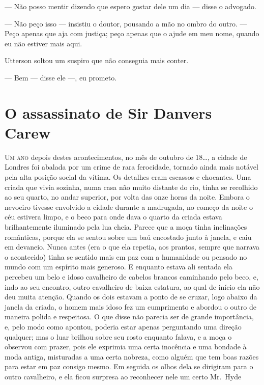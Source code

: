 --- Não posso mentir dizendo que espero gostar dele um dia --- disse o
advogado.

--- Não peço isso --- insistiu o doutor, pousando a mão no ombro do outro.
--- Peço apenas que aja com justiça; peço apenas que o ajude em meu nome,
quando eu não estiver mais aqui.

Utterson soltou um suspiro que não conseguia mais conter.

--- Bem --- disse ele ---, eu prometo.


\chapter[O assassinato de Sir Danvers Carew]{O assassinato de Sir Danvers Carew}

\textsc{Um ano} depois destes acontecimentos, no mês de outubro de 18\ldots{}, a
cidade de Londres foi abalada por um crime de rara ferocidade, tornado
ainda mais notável pela alta posição social da vítima.  Os detalhes
eram escassos e chocantes.  Uma criada que vivia sozinha, numa casa não
muito distante do rio, tinha se recolhido ao seu quarto, no andar
superior, por volta das onze horas da noite.  Embora o nevoeiro tivesse
envolvido a cidade durante a madrugada, no começo da noite o céu
estivera limpo, e o beco para onde dava o quarto da criada estava
brilhantemente iluminado pela lua cheia.  Parece que a moça tinha
inclinações românticas, porque ela se sentou sobre um baú encostado
junto à janela, e caiu em devaneio.  Nunca antes (era o que ela
repetia, aos prantos, sempre que narrava o acontecido) tinha se sentido
mais em paz com a humanidade ou pensado no mundo com um espírito mais
generoso.  E enquanto estava ali sentada ela percebeu um belo e idoso
cavalheiro de cabelos brancos caminhando pelo beco, e, indo ao seu
encontro, outro cavalheiro de baixa estatura, ao qual de início ela não
deu muita atenção.  Quando os dois estavam a ponto de se cruzar, logo
abaixo da janela da criada, o homem mais idoso fez um cumprimento e
abordou o outro de maneira polida e respeitosa.  O que disse não
parecia ser de grande importância, e, pelo modo como apontou, poderia
estar apenas perguntando uma direção qualquer; mas o luar brilhou sobre
seu rosto enquanto falava, e a moça o observou com prazer, pois ele
exprimia uma certa inocência e uma bondade à moda antiga, misturadas a
uma certa nobreza, como alguém que tem boas razões para estar em paz
consigo mesmo.  Em seguida os olhos dela se dirigiram para o outro
cavalheiro, e ela ficou surpresa ao reconhecer nele um certo Mr.~Hyde
